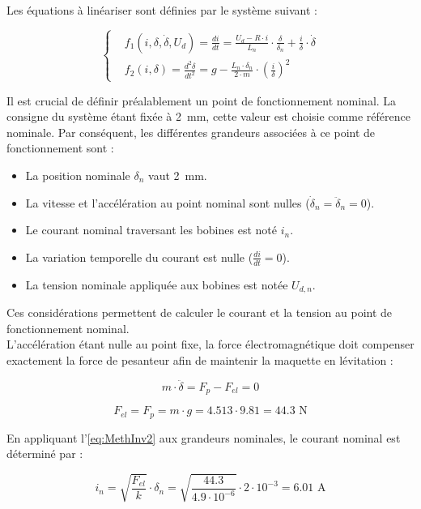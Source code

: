 Les équations à linéariser sont définies par le système suivant :

\begin{equation*}
    \left\{ \begin{aligned}
         & f_1(i, \delta, \dot{\delta}, U_{d}) = \frac{di}{dt} = \frac{U_d - R \cdot i}{L_n} \cdot \frac{\delta}{\delta_n} + \frac{i}{\delta} \cdot \dot{\delta} \\
         & f_2(i, \delta) = \frac{d^2\delta}{dt^2} = g - \frac{L_n \cdot \delta_n}{2 \cdot m} \cdot \left(\frac{i}{\delta}\right)^2
    \end{aligned} \right.
\end{equation*}

Il est crucial de définir préalablement un point de fonctionnement nominal. La consigne du système étant fixée à 2~mm, cette valeur est choisie comme référence nominale. Par conséquent, les différentes grandeurs associées à ce point de fonctionnement sont :

\begin{itemize}
    \item La position nominale $\delta_n$ vaut 2~mm.
    \item La vitesse et l'accélération au point nominal sont nulles ($\dot{\delta}_n = \ddot{\delta}_n = 0$).
    \item Le courant nominal traversant les bobines est noté $i_n$.
    \item La variation temporelle du courant est nulle ($\frac{di}{dt} = 0$).
    \item La tension nominale appliquée aux bobines est notée $U_{d,n}$.
\end{itemize}

Ces considérations permettent de calculer le courant et la tension au point de fonctionnement nominal.\\

L'accélération étant nulle au point fixe, la force électromagnétique doit compenser exactement la force de pesanteur afin de maintenir la maquette en lévitation :

$$m\cdot\ddot{\delta} = F_p - F_{el} = 0$$

\begin{equation}
    F_{el} = F_p = m\cdot g = 4.513 \cdot 9.81 = 44.3 \text{ N}
\end{equation}

En appliquant l'\autoref{eq:MethInv2} aux grandeurs nominales, le courant nominal est déterminé par :

\begin{equation}
    i_n = \sqrt{\frac{F_{el}}{k}}\cdot\delta_n = \sqrt{\frac{44.3}{4.9\cdot 10^{-6}}}\cdot 2\cdot 10^{-3} = 6.01 \text{ A}
\end{equation}

